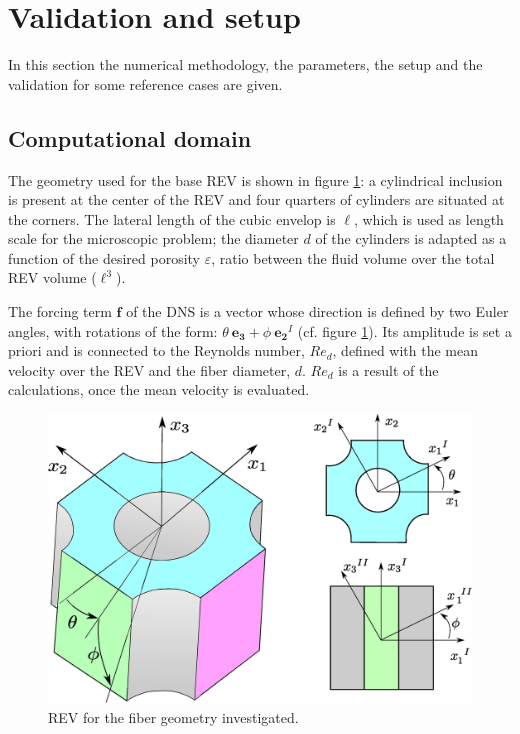 \section{Validation and setup }



In this section the numerical methodology, the parameters, the setup and the validation for some reference cases are given.



\subsection{Computational domain}



The geometry used for the base REV is shown in figure \ref{fig:cell_3d}: a cylindrical inclusion is present at the center of the REV and four quarters of cylinders are situated at the corners. The lateral length of the cubic envelop is $\ell$, which is used as length scale for the microscopic problem; the diameter $d$ of the cylinders is adapted as a function of the desired porosity $\varepsilon$, ratio between the fluid volume over the total REV volume ($\ell^3$). 

The  forcing term $\mathbf{f}$ of the DNS  is a vector whose direction is defined by two Euler angles, with rotations of the form:  $\theta \ \mathbf{e_3} + \phi \ \mathbf{e_2}^{I}$ (cf. figure \ref{fig:cell_3d}). Its amplitude is set a priori and is connected to the Reynolds number, $Re_d$, defined with the mean velocity over the REV and the fiber diameter, $d$. $Re_d$ is a result of the calculations, once the mean velocity is evaluated.

\begin{figure}[t]
	\centering
	\includegraphics[width=0.8\linewidth]{chapter_4/figure/cell_3d}
	\caption{REV for the fiber geometry investigated.}
	\label{fig:cell_3d}
\end{figure}


